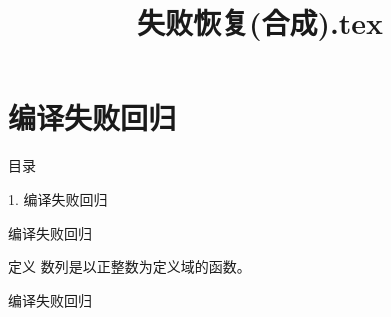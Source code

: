 \documentclass[aspectratio=169,10pt,fontset=fandol]{ctexbeamer}
\title{失败恢复(合成).tex}
\begin{document}
\section{编译失败回归}
\begin{frame}[t,fragile]{目录}
\normalsize
{\color{blue}\normalsize 1. 编译失败回归\par}\vspace{0.22em}
\end{frame}
\begin{frame}[t,fragile]{编译失败回归}
\normalsize
\begin{block}{定义}
{\normalsize
数列是以正整数为定义域的函数。
}
\end{block}
\end{frame}
\begin{frame}[t,fragile]{编译失败回归}
\normalsize
{\normalsize

\undefinedMathAgentFailure

}
\end{frame}
\end{document}
